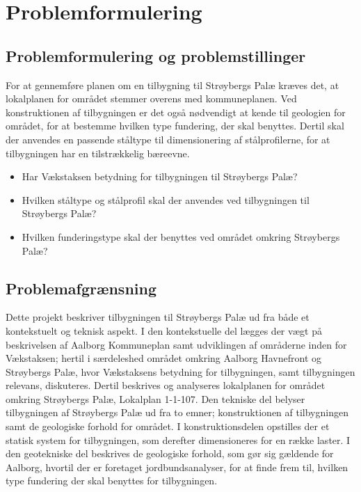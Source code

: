 \chapter{Problemformulering}

\section{Problemformulering og problemstillinger}
For at gennemføre planen om en tilbygning til Strøybergs Palæ kræves det, at lokalplanen for området stemmer overens med kommuneplanen. Ved konstruktionen af tilbygningen er det også nødvendigt at kende til geologien for området, for at bestemme hvilken type fundering, der skal benyttes. Dertil skal der anvendes en passende ståltype til dimensionering af stålprofilerne, for at tilbygningen har en tilstrækkelig bæreevne.

\begin{itemize} 
	\item Har Vækstaksen betydning for tilbygningen til Strøybergs Palæ?
	\item Hvilken ståltype og stålprofil skal der anvendes ved tilbygningen til Strøybergs Palæ? 
	\item Hvilken funderingstype skal der benyttes ved området omkring Strøybergs Palæ? 
\end{itemize} 

\section{Problemafgrænsning}
Dette projekt beskriver tilbygningen til Strøybergs Palæ ud fra både et kontekstuelt og teknisk aspekt. I den kontekstuelle del lægges der vægt på beskrivelsen af Aalborg Kommuneplan samt udviklingen af områderne inden for Vækstaksen; hertil i særdeleshed området omkring Aalborg Havnefront og Strøybergs Palæ, hvor Vækstaksens betydning for tilbygningen, samt tilbygningen relevans, diskuteres. Dertil beskrives og analyseres lokalplanen for området omkring Strøybergs Palæ, Lokalplan 1-1-107.
\newline \indent{     }  Den tekniske del belyser tilbygningen af Strøybergs Palæ ud fra to emner; konstruktionen af tilbygningen samt de geologiske forhold for området. 
\newline \indent{     }  I konstruktionsdelen opstilles der et statisk system for tilbygningen, som derefter dimensioneres for en række laster. 
\newline \indent{     }  I den geotekniske del beskrives de geologiske forhold, som gør sig gældende for Aalborg, hvortil der er foretaget jordbundsanalyser, for at finde frem til, hvilken type fundering der skal benyttes for tilbygningen.  